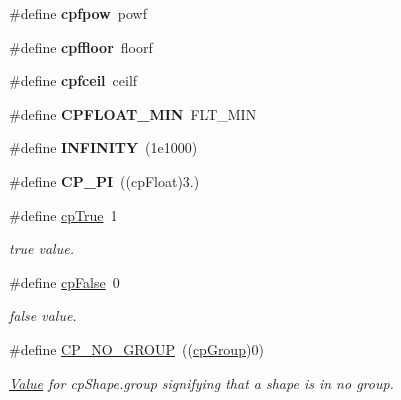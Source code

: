 \begin{DoxyCompactItemize}
\#define {\bfseries cpfpow}~powf
\item 
\mbox{\label{group__basicTypes_ga30d18ca635a6f80c1b39114d394ce3ea}} 
\#define {\bfseries cpffloor}~floorf
\item 
\mbox{\label{group__basicTypes_gaccf0915062d413aede408e4ef872b61d}} 
\#define {\bfseries cpfceil}~ceilf
\item 
\mbox{\label{group__basicTypes_ga9885777f2bb284bc9148d0b8031e620e}} 
\#define {\bfseries C\+P\+F\+L\+O\+A\+T\+\_\+\+M\+IN}~F\+L\+T\+\_\+\+M\+IN
\item 
\mbox{\label{group__basicTypes_ga956e2723d559858d08644ac99146e910}} 
\#define {\bfseries I\+N\+F\+I\+N\+I\+TY}~(1e1000)
\item 
\mbox{\label{group__basicTypes_ga45b75a58ad00a44f105ce2703dde3716}} 
\#define {\bfseries C\+P\+\_\+\+PI}~((cp\+Float)3.)
\item 
\mbox{\label{group__basicTypes_gae30fc24a6e711797b9d39efa0e999987}} 
\#define \hyperlink{group__basicTypes_gae30fc24a6e711797b9d39efa0e999987}{cp\+True}~1
\begin{DoxyCompactList}\small\item\em true value. \end{DoxyCompactList}\item 
\mbox{\label{group__basicTypes_ga4b0cfe38ff97abec3400f9bb7e18f21e}} 
\#define \hyperlink{group__basicTypes_ga4b0cfe38ff97abec3400f9bb7e18f21e}{cp\+False}~0
\begin{DoxyCompactList}\small\item\em false value. \end{DoxyCompactList}\item 
\mbox{\label{group__basicTypes_gabd2870d269e0288b26b045c81a07acc8}} 
\#define \hyperlink{group__basicTypes_gabd2870d269e0288b26b045c81a07acc8}{C\+P\+\_\+\+N\+O\+\_\+\+G\+R\+O\+UP}~((\hyperlink{group__basicTypes_gacd811b1135a8f4a3e5cc019552b18b1a}{cp\+Group})0)
\begin{DoxyCompactList}\small\item\em \hyperlink{classValue}{Value} for cp\+Shape.\+group signifying that a shape is in no group. \end{DoxyCompactList}\item 

\end{DoxyCompactItemize}
